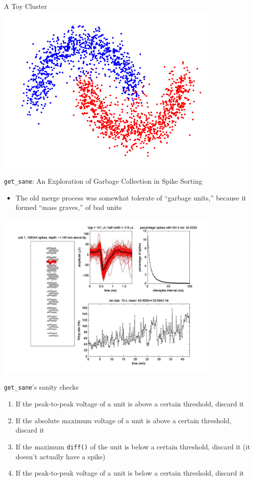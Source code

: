 \documentclass{beamer}
\begin{document}
    \begin{frame}{A Toy Cluster}
        \pause
        \includegraphics[width=110mm]{images/cluster.png}
    \end{frame}

    \begin{frame}{\texttt{get\_sane}: An Exploration of Garbage Collection in
Spike Sorting}
        \begin{itemize}
            \pause
            \item The old merge process was somewhat tolerate of ``garbage
units,'' because it formed ``mass graves,'' of bad units
            \pause
        \end{itemize}
        \includegraphics[width=110mm]{images/unit1.jpg}
    \end{frame}

    \begin{frame}{\texttt{get\_sane}'s sanity checks}
        \begin{enumerate}
            \pause
            \item If the peak-to-peak voltage of a unit is above a certain
threshold, discard it
            \pause
            \item If the absolute maximum voltage of a unit is above a certain
threshold, discard it 
            \pause
            \item If the maximum \texttt{diff()} of the unit is below a certain
threshold, discard it (it doesn't actually have a spike)
            \pause
            \item If the peak-to-peak voltage of a unit is below a certain
threshold, discard it
         \end{enumerate}
    \end{frame}
\end{document}
